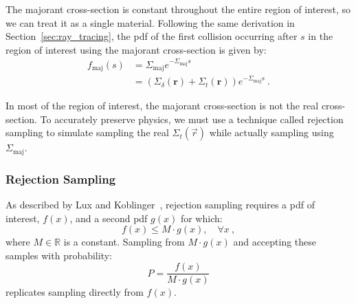 The majorant cross-section is constant throughout the entire region of
interest, so we can treat it as a single material. Following the same derivation in
Section~\ref{sec:ray_tracing}, the \gls{pdf} of the first collision occurring after
$s$ in the region of interest using the majorant cross-section is given by:
\begin{align}
 f_{\mathrm{maj}}(s) &= \Sigma_{\mathrm{maj}}e^{-\Sigma_{\mathrm{maj}}s}\\
& = (\Sigma_{\delta}(\mathbf{r}) + \Sigma_{t}(\mathbf{r}))e^{-\Sigma_{\mathrm{maj}}s}\:.
  \label{eq:majorantpdf}
\end{align}

In most of the region of interest, the majorant cross-section is not
the real cross-section. To accurately preserve physics, we must use a technique called rejection
sampling to simulate sampling the real $\Sigma_t(\vec{r})$ while
actually sampling using $\Sigma_\mathrm{maj}$. 

\subsubsection{Rejection Sampling}
\label{sec:rejection_sampling}
As described by Lux and
Koblinger~\cite{lux1991}, rejection sampling requires a \gls{pdf} of
interest, $f(x)$, and a second \gls{pdf} $g(x)$ for which:
\begin{equation}
  \label{eq:Mleq}
  f(x) \leq M\cdot g(x), \quad \forall x\:,
\end{equation} where $M \in \mathbb{R}$ is a constant.
Sampling from $M\cdot g(x)$ and accepting these samples with probability:
\begin{equation}
  \label{eq:preal}
  P = \frac{f(x)}{M\cdot g(x)}
\end{equation}
replicates sampling directly from $f(x)$. 

